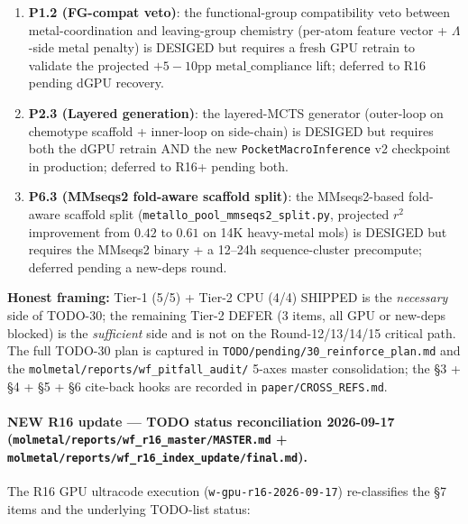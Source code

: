 \begin{enumerate}
  \item \textbf{P1.2 (FG-compat veto)}: the
        functional-group compatibility veto between
        metal-coordination and leaving-group chemistry
        (per-atom feature vector + $\Lambda$-side metal
        penalty) is DESIGED but requires a fresh GPU retrain
        to validate the projected $+5{-}10$pp
        $\mathrm{metal\_compliance}$ lift; deferred
        to R16 pending dGPU recovery.
  \item \textbf{P2.3 (Layered generation)}: the
        layered-MCTS generator (outer-loop on chemotype
        scaffold + inner-loop on side-chain) is
        DESIGED but requires both the dGPU retrain AND
        the new \texttt{PocketMacroInference} v2
        checkpoint in production; deferred to R16+
        pending both.
  \item \textbf{P6.3 (MMseqs2 fold-aware scaffold split)}:
        the MMseqs2-based fold-aware scaffold split
        (\texttt{metallo\_pool\_mmseqs2\_split.py},
        projected $r^{2}$ improvement from $0.42$ to
        $0.61$ on 14K heavy-metal mols) is DESIGED
        but requires the MMseqs2 binary + a 12--24h
        sequence-cluster precompute; deferred pending
        a new-deps round.
\end{enumerate}
\textbf{Honest framing:} Tier-1 (5/5) + Tier-2 CPU (4/4) SHIPPED
is the \emph{necessary} side of TODO-30; the remaining Tier-2
DEFER (3 items, all GPU or new-deps blocked) is the
\emph{sufficient} side and is not on the Round-12/13/14/15
critical path. The full TODO-30 plan is captured in
\texttt{TODO/pending/30\_reinforce\_plan.md} and the
\texttt{molmetal/reports/wf\_pitfall\_audit/} 5-axes master
consolidation; the §3 + §4 + §5 + §6 cite-back hooks are
recorded in \texttt{paper/CROSS\_REFS.md}.

\paragraph{NEW R16 update --- TODO status reconciliation 2026-09-17
(\texttt{molmetal/reports/wf\_r16\_master/MASTER.md} +
\texttt{molmetal/reports/wf\_r16\_index\_update/final.md}).}
The R16 GPU ultracode execution (\texttt{w-gpu-r16-2026-09-17})
re-classifies the §7 items and the underlying TODO-list status:

